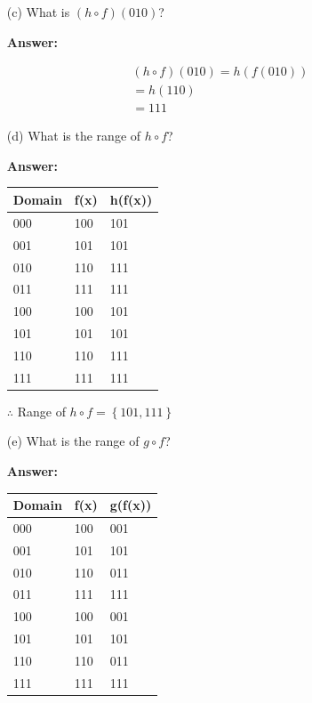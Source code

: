\documentclass[14pt]{extreport}
\newcommand{\answer}[0]{\medskip \textbf{Answer:} \medskip}
\begin{document}
\begin{enumerate}
    \item[(c)] What is \( (h \circ f)(010) \)?
    
        \answer

        \begin{align*}
            \left ( h \circ f \right )\left ( 010 \right ) = h\left ( f\left ( 010 \right ) \right ) \\
            = h(110) \\
            = 111
        \end{align*}

    \item[(d)] What is the range of \( h \circ f \)?
    
        \answer

        \begin{table}[H]
            \centering
            \hspace{20mm}
            \begin{tabular}{lll}
            Domain & f(x) & h(f(x)) \\ \hline
            000    & 100  & 101     \\
            001    & 101  & 101     \\
            010    & 110  & 111     \\
            011    & 111  & 111     \\
            100    & 100  & 101     \\
            101    & 101  & 101     \\
            110    & 110  & 111     \\
            111    & 111  & 111    
            \end{tabular}
        \end{table}

        $\therefore$ Range of $h \circ f = \left \{ 101, 111 \right \}$
        \newpage

    \item[(e)] What is the range of \( g \circ f \)?
    
        \answer
    
        \begin{table}[H]
            \centering
            \hspace{20mm}
            \begin{tabular}{lll}
            Domain & f(x) & g(f(x)) \\ \hline
            000    & 100  & 001     \\
            001    & 101  & 101     \\
            010    & 110  & 011     \\
            011    & 111  & 111     \\
            100    & 100  & 001     \\
            101    & 101  & 101     \\
            110    & 110  & 011     \\
            111    & 111  & 111    
            \end{tabular}
        \end{table}


\end{enumerate}
\end{document}

